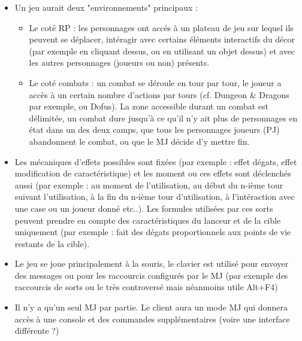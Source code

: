 \documentclass[a4paper]{article}
\begin{document}
	\begin{itemize}[label={}]
		\item Un jeu aurait deux "environnements" principaux : 
		\begin{itemize}
			\item Le coté RP : les personnages ont accés à un plateau de jeu sur lequel ils peuvent se déplacer, intéragir avec certains éléments interactifs du décor (par exemple en cliquant dessus, ou en utilisant un objet dessus) et avec les autres personnages (joueurs ou non) présents.
			\item Le coté combats : un combat se déroule en tour par tour, le joueur a accès à un certain nombre d'actions par tours (cf. Dungeon \& Dragons par exemple, ou Dofus). La zone accessible durant un combat est délimitée, un combat dure jusqu'à ce qu'il n'y ait plus de personnages en état dans un des deux camps, que tous les personnages joueurs (PJ) abandonnent le combat, ou que le MJ décide d'y mettre fin.
		\end{itemize}
		\item Les mécaniques d'effets possibles sont fixées (par exemple : effet dégats, effet modification de caractéristique) et les moment ou ces effets sont déclenchés aussi (par exemple : au moment de l'utilisation, au début du n-ième tour suivant l'utilisation, à la fin du n-ième tour d'utilisation, à l'intéraction avec une case ou un joueur donné etc..). Les formules utilisées par ces sorts peuvent prendre en compte des caractéristiques du lanceur et de la cible uniquement (par exemple : fait des dégats proportionnels aux points de vie restants de la cible).
		\item Le jeu se joue principalement à la souris, le clavier est utilisé pour envoyer des messages ou pour les raccourcis configurés par le MJ (par exemple des raccourcis de sorts ou le très controversé mais néanmoins utile Alt+F4)
		\item Il n'y a qu'un seul MJ par partie. Le client aura un mode MJ qui donnera accès à une console et des commandes supplémentaires (voire une interface différente ?)
	\end{itemize}
	
\end{document}
